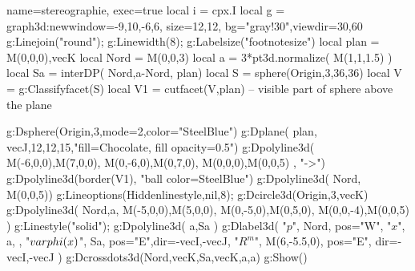 \documentclass[12pt]{standalone}
\begin{document}
\begin{luadraw}{name=stereographie, exec=true}
local i = cpx.I
local g = graph3d:new{window={-9,10,-6,6}, size={12,12}, bg="gray!30",viewdir={30,60}}
g:Linejoin("round"); g:Linewidth(8); g:Labelsize("footnotesize")
local plan = {M(0,0,0),vecK}
local Nord = M(0,0,3)
local a = 3*pt3d.normalize( M(1,1,1.5) )
local Sa = interDP( {Nord,a-Nord}, plan)
local S = sphere(Origin,3,36,36)
local V = g:Classifyfacet(S)
local V1 = cutfacet(V,plan) -- visible part of sphere above the plane

g:Dsphere(Origin,3,{mode=2,color="SteelBlue"})
g:Dplane( plan, vecJ,12,12,15,"fill=Chocolate, fill opacity=0.5")
g:Dpolyline3d( {{M(-6,0,0),M(7,0,0)}, {M(0,-6,0),M(0,7,0)}, {M(0,0,0),M(0,0,5)} }, "->")
g:Dpolyline3d(border(V1), "ball color=SteelBlue")
g:Dpolyline3d( {Nord, M(0,0,5)})
g:Lineoptions(Hiddenlinestyle,nil,8); g:Dcircle3d(Origin,3,vecK)
g:Dpolyline3d({ {Nord,a}, {M(-5,0,0),M(5,0,0)}, {M(0,-5,0),M(0,5,0)}, {M(0,0,-4),M(0,0,5)} })
g:Linestyle("solid"); g:Dpolyline3d( {a,Sa} )
g:Dlabel3d(
    "$p$", Nord, {pos="W"},
    "$x$", a, {},
    "$\\varphi(x)$", Sa, {pos="E",dir={-vecI,-vecJ}},
    "$R^m$", M(6,-5.5,0), {pos="E", dir={-vecI,-vecJ}} )
g:Dcrossdots3d({{Nord,vecK},{Sa,vecK},{a,a}})
g:Show()
\end{luadraw}
\end{document}
